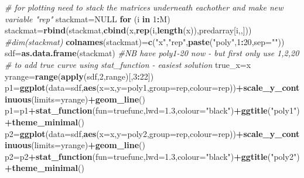 \documentclass[]{article}
\newenvironment{Shaded}{\begin{snugshade}}{\end{snugshade}}
\newcommand{\KeywordTok}[1]{\textcolor[rgb]{0.13,0.29,0.53}{\textbf{#1}}}
\newcommand{\DataTypeTok}[1]{\textcolor[rgb]{0.13,0.29,0.53}{#1}}
\newcommand{\DecValTok}[1]{\textcolor[rgb]{0.00,0.00,0.81}{#1}}
\newcommand{\FloatTok}[1]{\textcolor[rgb]{0.00,0.00,0.81}{#1}}
\newcommand{\StringTok}[1]{\textcolor[rgb]{0.31,0.60,0.02}{#1}}
\newcommand{\CommentTok}[1]{\textcolor[rgb]{0.56,0.35,0.01}{\textit{#1}}}
\newcommand{\OtherTok}[1]{\textcolor[rgb]{0.56,0.35,0.01}{#1}}
\newcommand{\ControlFlowTok}[1]{\textcolor[rgb]{0.13,0.29,0.53}{\textbf{#1}}}
\newcommand{\OperatorTok}[1]{\textcolor[rgb]{0.81,0.36,0.00}{\textbf{#1}}}
\newcommand{\NormalTok}[1]{#1}
\begin{document}
\begin{Shaded}
\begin{Highlighting}[]
\CommentTok{# for plotting need to stack the matrices underneath eachother and make new variable "rep"}
\NormalTok{stackmat=}\OtherTok{NULL}
\ControlFlowTok{for}\NormalTok{ (i }\ControlFlowTok{in} \DecValTok{1}\OperatorTok{:}\NormalTok{M) stackmat=}\KeywordTok{rbind}\NormalTok{(stackmat,}\KeywordTok{cbind}\NormalTok{(x,}\KeywordTok{rep}\NormalTok{(i,}\KeywordTok{length}\NormalTok{(x)),predarray[i,,]))}
\CommentTok{#dim(stackmat)}
\KeywordTok{colnames}\NormalTok{(stackmat)=}\KeywordTok{c}\NormalTok{(}\StringTok{"x"}\NormalTok{,}\StringTok{"rep"}\NormalTok{,}\KeywordTok{paste}\NormalTok{(}\StringTok{"poly"}\NormalTok{,}\DecValTok{1}\OperatorTok{:}\DecValTok{20}\NormalTok{,}\DataTypeTok{sep=}\StringTok{""}\NormalTok{))}
\NormalTok{sdf=}\KeywordTok{as.data.frame}\NormalTok{(stackmat) }\CommentTok{#NB have poly1-20 now - but first only use 1,2,20}
\CommentTok{# to add true curve using stat_function - easiest solution}
\NormalTok{true_x=x}
\NormalTok{yrange=}\KeywordTok{range}\NormalTok{(}\KeywordTok{apply}\NormalTok{(sdf,}\DecValTok{2}\NormalTok{,range)[,}\DecValTok{3}\OperatorTok{:}\DecValTok{22}\NormalTok{])}
\NormalTok{p1=}\KeywordTok{ggplot}\NormalTok{(}\DataTypeTok{data=}\NormalTok{sdf,}\KeywordTok{aes}\NormalTok{(}\DataTypeTok{x=}\NormalTok{x,}\DataTypeTok{y=}\NormalTok{poly1,}\DataTypeTok{group=}\NormalTok{rep,}\DataTypeTok{colour=}\NormalTok{rep))}\OperatorTok{+}\KeywordTok{scale_y_continuous}\NormalTok{(}\DataTypeTok{limits=}\NormalTok{yrange)}\OperatorTok{+}\KeywordTok{geom_line}\NormalTok{()}
\NormalTok{p1=p1}\OperatorTok{+}\KeywordTok{stat_function}\NormalTok{(}\DataTypeTok{fun=}\NormalTok{truefunc,}\DataTypeTok{lwd=}\FloatTok{1.3}\NormalTok{,}\DataTypeTok{colour=}\StringTok{"black"}\NormalTok{)}\OperatorTok{+}\KeywordTok{ggtitle}\NormalTok{(}\StringTok{"poly1"}\NormalTok{)}\OperatorTok{+}\KeywordTok{theme_minimal}\NormalTok{()}
\NormalTok{p2=}\KeywordTok{ggplot}\NormalTok{(}\DataTypeTok{data=}\NormalTok{sdf,}\KeywordTok{aes}\NormalTok{(}\DataTypeTok{x=}\NormalTok{x,}\DataTypeTok{y=}\NormalTok{poly2,}\DataTypeTok{group=}\NormalTok{rep,}\DataTypeTok{colour=}\NormalTok{rep))}\OperatorTok{+}\KeywordTok{scale_y_continuous}\NormalTok{(}\DataTypeTok{limits=}\NormalTok{yrange)}\OperatorTok{+}\KeywordTok{geom_line}\NormalTok{()}
\NormalTok{p2=p2}\OperatorTok{+}\KeywordTok{stat_function}\NormalTok{(}\DataTypeTok{fun=}\NormalTok{truefunc,}\DataTypeTok{lwd=}\FloatTok{1.3}\NormalTok{,}\DataTypeTok{colour=}\StringTok{"black"}\NormalTok{)}\OperatorTok{+}\KeywordTok{ggtitle}\NormalTok{(}\StringTok{"poly2"}\NormalTok{)}\OperatorTok{+}\KeywordTok{theme_minimal}\NormalTok{()}

\end{Highlighting}
\end{Shaded}
\end{document}
